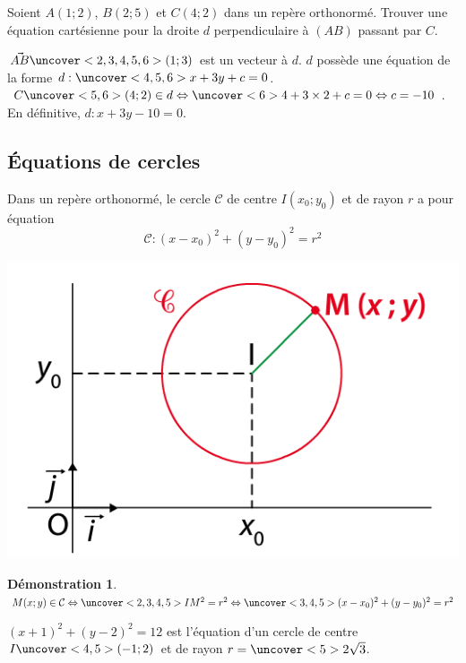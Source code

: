 \documentclass{beamer}
\theoremstyle{plain}
\newtheorem{demonstration}[theorem]{Démonstration}
\begin{document}
 \begin{frame}
 \begin{example}
  Soient $A(1;2)$, $B(2;5)$ et $C(4;2)$ dans un repère orthonormé. Trouver une équation 
  cartésienne pour la droite $d$ perpendiculaire à $(AB)$ passant par $C$.
  
  $\vec{AB}\uncover<2,3,4,5,6>{(1;3)}$ est un vecteur  à $d$. 
  $d$ possède une équation de la forme $d:\uncover<4,5,6>{x+3y+c=0}$.
  $C\uncover<5,6>{(4;2)} \in d \Leftrightarrow \uncover<6>{4+3 \times 2+c=0} \Leftrightarrow c=-10$. En définitive,
  $d:x+3y-10=0$.
 \end{example}
 \end{frame}
 
 \subsection{\'Equations de cercles}

 \begin{frame}
\begin{theorem}
 Dans un repère orthonormé, le cercle $\mathcal{C}$ de centre $I(x_0;y_0)$ et de rayon $r$ a
 pour équation $$\mathcal{C}:(x-x_0)^2+(y-y_0)^2=r^2$$
 
      \begin{center}
    \includegraphics[scale=0.5]{../Images/cercleCentreI.png}
  \end{center}
\end{theorem}

\end{frame}

\begin{frame}
\begin{demonstration}
 $M(x;y) \in \mathcal{C} \Leftrightarrow \uncover<2,3,4,5>{IM^2=r^2} 
 \Leftrightarrow \uncover<3,4,5>{(x-x_0)^2+(y-y_0)^2=r^2}$
\end{demonstration}


\begin{example}
 $(x+1)^2+(y-2)^2=12$ est l'équation d'un cercle de centre $I\uncover<4,5>{(-1;2)}$ et de rayon 
 $r=\uncover<5>{2\sqrt{3}}$.
\end{example}
\end{frame}
\end{document}
